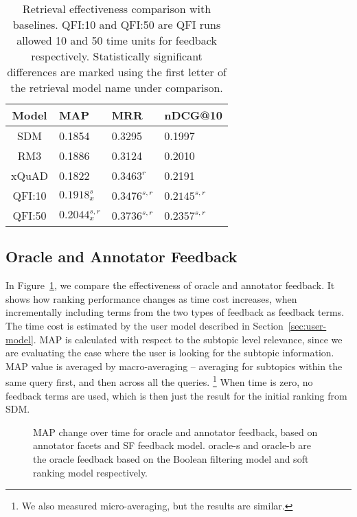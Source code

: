 \begin{table}[H]
\centering
\caption{Retrieval effectiveness comparison with baselines. QFI:10 and QFI:50 are QFI runs allowed 10 and 50 time units for feedback respectively. Statistically significant differences are marked using the first letter of the retrieval model name under comparison.}
\label{fig:cmp-other}
\begin{tabular}{|c|l|l|l|} \hline
Model & MAP & MRR & nDCG@10\\ \hline
SDM & 0.1854 & 0.3295 & 0.1997\\ \hline
RM3 & 0.1886 & 0.3124 & 0.2010\\ \hline
xQuAD & 0.1822 & $0.3463^{r}$ & 0.2191\\ \hline
QFI:10 & $0.1918^{s}_{x}$ & $0.3476^{s,r}$ & $0.2145^{s,r}$\\ \hline
QFI:50 & $0.2044^{s,r}_{x}$ & $0.3736^{s,r}$ & $0.2357^{s,r}$\\ \hline 

\end{tabular}
\end{table}

\subsection{Oracle and Annotator Feedback}
In Figure~\ref{fig:feedback}, we compare the effectiveness of oracle and annotator feedback. It shows how ranking performance changes as time cost increases, when incrementally including terms from the two types of feedback as feedback terms. The time cost is estimated by the user model described in Section~\ref{sec:user-model}. MAP is calculated with respect to the subtopic level relevance, since we are evaluating the case where the user is looking for the subtopic information. MAP value is averaged by macro-averaging -- averaging for subtopics within the same query first, and then across all the queries. \footnote{We also measured micro-averaging, but the results are similar.} When time is zero, no feedback terms are used, which is then just the result for the initial ranking from SDM.
\begin{figure}[H]
\centering
\caption{MAP change over time for oracle and annotator feedback, based on annotator facets and SF feedback model. oracle-s and oracle-b are the oracle feedback based on the Boolean filtering model and soft ranking model respectively.}
\label{fig:feedback}
\end{figure}

